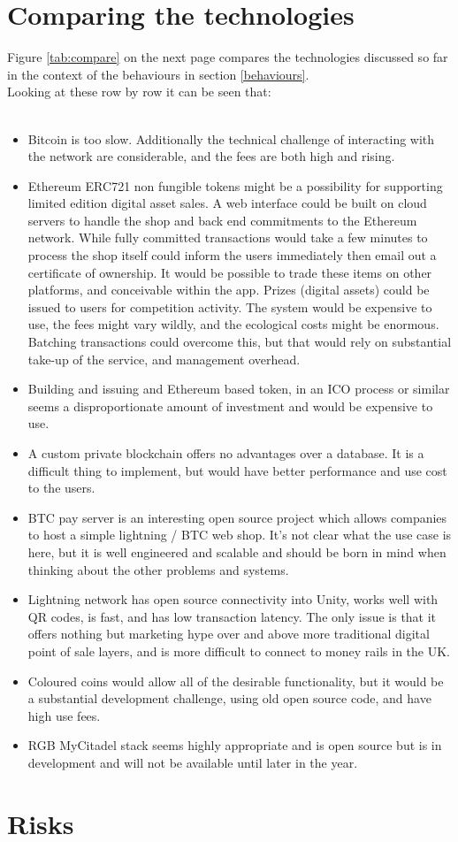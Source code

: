 \section{Comparing the technologies}
Figure \ref{tab:compare} on the next page compares the technologies discussed so far in the context of the behaviours in section \ref{behaviours}. \\
Looking at these row by row it can be seen that:\\\
\begin{itemize}
\item Bitcoin is too slow. Additionally the technical challenge of interacting with the network are considerable, and the fees are both high and rising.
\item Ethereum ERC721 non fungible tokens might be a possibility for supporting limited edition digital asset sales. A web interface could be built on cloud servers to handle the shop and back end commitments to the Ethereum network. While fully committed transactions would take a few minutes to process the shop itself could inform the users immediately then email out a certificate of ownership. It would be possible to trade these items on other platforms, and conceivable within the app. Prizes (digital assets) could be issued to users for competition activity. The system would be expensive to use, the fees might vary wildly, and the ecological costs might be enormous. Batching transactions could overcome this, but that would rely on substantial take-up of the service, and management overhead.
\item Building and issuing and Ethereum based token, in an ICO process or similar seems a disproportionate amount of investment and would be expensive to use. 
\item A custom private blockchain offers no advantages over a database. It is a difficult thing to implement, but would have better performance and use cost to the users.
\item BTC pay server is an interesting open source project which allows companies to host a simple lightning / BTC web shop. It's not clear what the use case is here, but it is well engineered and scalable and should be born in mind when thinking about the other problems and systems.
\item Lightning network has open source connectivity into Unity, works well with QR codes, is fast, and has low transaction latency. The only issue is that it offers nothing but marketing hype over and above more traditional digital point of sale layers, and is more difficult to connect to money rails in the UK.
\item Coloured coins would allow all of the desirable functionality, but it would be a substantial development challenge, using old open source code, and have high use fees. 
\item RGB MyCitadel stack seems highly appropriate and is open source but is in development and will not be available until later in the year.
\end{itemize}

\section{Risks}


